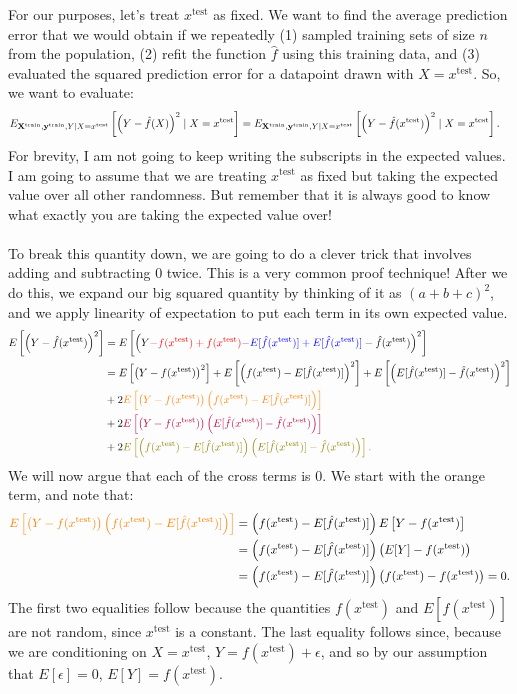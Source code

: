 \documentclass[titlepage,10pt]{scrartcl}
\newcommand{\xte}{x^{\mathrm{test}}}
\begin{document}
For our purposes, let's treat $\xte$ as fixed. We want to find the average prediction error that we would obtain if we repeatedly (1) sampled training sets of size $n$ from the population, (2) refit the function $\hat{f}$ using this training data, and (3) evaluated the squared prediction error for a datapoint drawn with $X = \xte$. So, we want to evaluate: 
\begin{align*}
	E_{\bold{X}^\mathrm{train}, \bold{y}^\mathrm{train},Y \mid X=\xte}\left[\left(Y - \hat{f}(X)\right)^2 \mid X=\xte \right] &= 	E_{\bold{X}^\mathrm{train}, \bold{y}^\mathrm{train},Y \mid X=\xte}\left[\left(Y - \hat{f}(\xte)\right)^2 \mid X=\xte \right]. 
\end{align*}
For brevity, I am not going to keep writing the subscripts in the expected values. I am going to assume that we are treating $\xte$ as fixed but taking the expected value over all other randomness. But remember that it is always good to know what exactly you are taking the expected value over! \\
\\
To break this quantity down, we are going to do a clever trick that involves adding and subtracting $0$ twice. This is a very common proof technique! After we do this, we expand our big squared quantity by thinking of it as $(a+b+c)^2$, and we apply linearity of expectation to put each term in its own expected value.  
\begin{align*}
  E\left[\left(Y - \hat{f}(\xte)\right)^2 \right] &=   E\left[\left(Y  \textcolor{red}{-f(\xte) + f(\xte)} \textcolor{blue}{-E[\hat{f}(\xte)] + E[\hat{f}(\xte)]} -  \hat{f}(\xte)\right)^2 \right]  \\
  &= E\left[\left(Y -f(\xte)\right)^2\right] + E\left[\left(f(\xte) - E[\hat{f}(\xte)]\right)^2\right] + E\left[\left(E[\hat{f}(\xte)] -  \hat{f}(\xte)\right)^2\right] \\
  & + 2 \textcolor{orange}{E\left[\left(Y -f(\xte)\right) \left(f(\xte) - E[\hat{f}(\xte)]\right)\right]}\\
  & + 2 \textcolor{purple}{E\left[\left(Y -f(\xte)\right) \left(E[\hat{f}(\xte)] -  \hat{f}(\xte)\right)\right]} \\
  & + 2  \textcolor{olive}{E\left[\left(f(\xte) - E[\hat{f}(\xte)]\right) \left(E[\hat{f}(\xte)] -  \hat{f}(\xte)\right)\right].  }
\end{align*}
We will now argue that each of the cross terms is $0$. We start with the orange term, and note that: 
\begin{align*}
\textcolor{orange}{E\left[\left(Y -f(\xte)\right) \left(f(\xte) - E[\hat{f}(\xte)]\right)\right]} &= \left(f(\xte) - E[\hat{f}(\xte)]\right) E\left[ Y -f(\xte)\right]\\
&= \left(f(\xte) - E[\hat{f}(\xte)]\right) \left( E[Y] -f(\xte)\right)\\
&= 	\left(f(\xte) - E[\hat{f}(\xte)]\right) \left(f(\xte) -f(\xte)\right) = 0. 
\end{align*}
The first two equalities follow because the quantities $f(\xte)$ and $E[\hat{f}(\xte)]$ are not random, since $\xte$ is a constant. The last equality follows since, because we are conditioning on $X = \xte$, $Y = f(\xte) + \epsilon$, and so by our assumption that $E[\epsilon]=0$, $E[Y] =f(\xte)$. 
\end{document}
